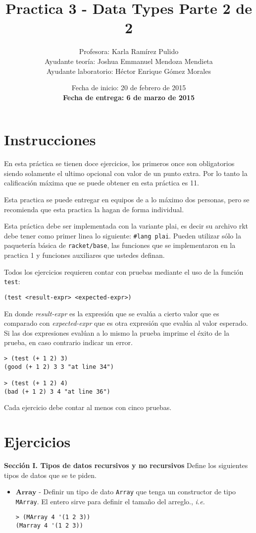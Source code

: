 \documentclass{article}
\author{Profesora: Karla Ramírez Pulido\\
  Ayudante teoría: Joshua Emmanuel Mendoza Mendieta\\
  Ayudante laboratorio: Héctor Enrique Gómez Morales}
\title{Practica 3 - Data Types Parte 2 de 2}
\date{Fecha de inicio: 20 de febrero de 2015\\
  \textbf{Fecha de entrega: 6 de marzo de 2015}}
\begin{document}
\maketitle
\section{Instrucciones}
En esta práctica se tienen doce ejercicios, los primeros once son
obligatorios siendo solamente el ultimo opcional con valor de un
punto extra. Por lo tanto la calificación máxima que se puede obtener en
esta práctica es 11.

Esta practica se puede entregar en equipos de a lo máximo dos
personas, pero se recomienda que esta practica la hagan de forma
individual.

Esta práctica debe ser implementada con la variante plai, es decir
su archivo rkt debe tener como primer linea lo siguiente:
\texttt{\#lang plai}. Pueden utilizar sólo la paquetería básica de
\texttt{racket/base}, las funciones que se implementaron en la
practica 1 y funciones auxiliares que ustedes definan.

Todos los ejercicios requieren contar con pruebas mediante el uso de
la función \texttt{test}:
\begin{verbatim}
(test <result-expr> <expected-expr>)
\end{verbatim}

En donde \textit{result-expr} es la expresión que se evalúa a cierto
valor que es comparado con \textit{expected-expr} que es otra
expresión que evalúa al valor esperado. Si las dos expresiones evalúan
a lo mismo la prueba imprime el éxito de la prueba, en caso contrario
indicar un error.

\begin{verbatim}
> (test (+ 1 2) 3)
(good (+ 1 2) 3 3 "at line 34")

> (test (+ 1 2) 4)
(bad (+ 1 2) 3 4 "at line 36")
\end{verbatim}

Cada ejercicio debe contar al menos con cinco pruebas.

\section{Ejercicios}
\textbf{Sección I. Tipos de datos recursivos y no recursivos} Define
los siguientes tipos de datos que se te piden.

\begin{itemize}
\item $\textbf{Array}$ - Definir un tipo de dato \texttt{Array}
  que tenga un constructor de tipo \texttt{MArray}. El entero sirve
  para definir el tamaño del arreglo., \textit{i.e.}
\begin{verbatim}
> (MArray 4 '(1 2 3))
(Marray 4 '(1 2 3))
\end{verbatim}
\end{itemize}
\end{document}
